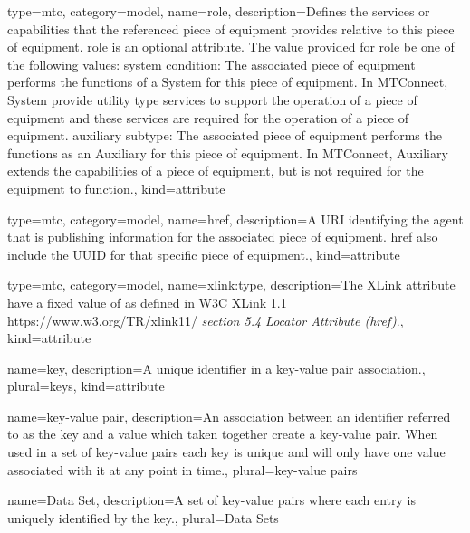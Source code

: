 {
  type=mtc,
  category=model,
  name={role},
  description={Defines the services or capabilities that the referenced piece of equipment provides relative to this piece of equipment.
  \newline \gls{role} is an optional attribute.
  \newline The value provided for \gls{role} \MUST be one of the following values:
  \newline \tab \gls{system condition}:  The associated piece of equipment performs the functions of a System for this piece of equipment.  In MTConnect, System provide utility type services to support the operation of a piece of equipment and these services are required for the operation of a piece of equipment.
  \newline \tab \gls{auxiliary subtype}:  The associated piece of equipment performs the functions as an Auxiliary for this piece of equipment.  In MTConnect, Auxiliary extends the capabilities of a piece of equipment, but is not required for the equipment to function.},
  kind={attribute}
}


{
  type=mtc,
  category=model,
  name={href},
  description={A URI identifying the \gls{agent} that is publishing information for the associated piece of equipment. \gls{href} \MUST also include the UUID for that specific piece of equipment.},  
  kind={attribute}
}

{
  type=mtc,
  category=model,
  name={xlink:type},
  description={The XLink  attribute \MUST have a fixed value of  as defined in W3C XLink 1.1 https://www.w3.org/TR/xlink11/ \textit{section 5.4 Locator Attribute (href)}.},
  kind={attribute}
}

{
  name={key},
  description={A unique identifier in a \gls{key-value pair} association.},
  plural={keys},
  kind={attribute}
}

{
  name={key-value pair},
  description={An association between an identifier referred to as the \gls{key} and a value which taken together create a \gls{key-value pair}. When used in a set of \glspl{key-value pair} each \gls{key} is unique and will only have one value associated with it at any point in time.},
  plural={key-value pairs}
}


{
  name={Data Set},
  description={A set of \glspl{key-value pair} where each entry is uniquely identified by the \gls{key}.},
  plural={Data Sets}
}


